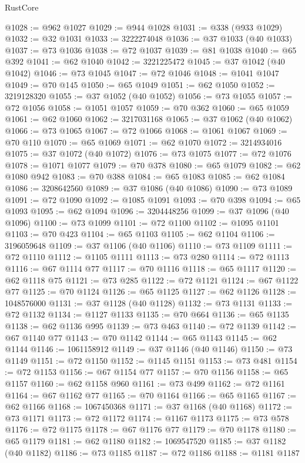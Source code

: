 \begin{lexlean}{RustCore}
\begin{coremodule}
@1028 := @962 @1027
@1029 := @944 @1028
@1031 := @338 (@933 @1029)
@1032 := @32 @1031
@1033 := 3222274048
@1036 := @37 @1033 (@40 @1033)
@1037 := @73 @1036
@1038 := @72 @1037
@1039 := @81 @1038
@1040 := @65 @392
@1041 := @62 @1040
@1042 := 3221225472
@1045 := @37 @1042 (@40 @1042)
@1046 := @73 @1045
@1047 := @72 @1046
@1048 := @1041 @1047
@1049 := @70 @145
@1050 := @65 @1049
@1051 := @62 @1050
@1052 := 3219128320
@1055 := @37 @1052 (@40 @1052)
@1056 := @73 @1055
@1057 := @72 @1056
@1058 := @1051 @1057
@1059 := @70 @362
@1060 := @65 @1059
@1061 := @62 @1060
@1062 := 3217031168
@1065 := @37 @1062 (@40 @1062)
@1066 := @73 @1065
@1067 := @72 @1066
@1068 := @1061 @1067
@1069 := @70 @110
@1070 := @65 @1069
@1071 := @62 @1070
@1072 := 3214934016
@1075 := @37 @1072 (@40 @1072)
@1076 := @73 @1075
@1077 := @72 @1076
@1078 := @1071 @1077
@1079 := @70 @378
@1080 := @65 @1079
@1082 := @62 @1080 @942
@1083 := @70 @388
@1084 := @65 @1083
@1085 := @62 @1084
@1086 := 3208642560
@1089 := @37 @1086 (@40 @1086)
@1090 := @73 @1089
@1091 := @72 @1090
@1092 := @1085 @1091
@1093 := @70 @398
@1094 := @65 @1093
@1095 := @62 @1094
@1096 := 3204448256
@1099 := @37 @1096 (@40 @1096)
@1100 := @73 @1099
@1101 := @72 @1100
@1102 := @1095 @1101
@1103 := @70 @423
@1104 := @65 @1103
@1105 := @62 @1104
@1106 := 3196059648
@1109 := @37 @1106 (@40 @1106)
@1110 := @73 @1109
@1111 := @72 @1110
@1112 := @1105 @1111
@1113 := @73 @280
@1114 := @72 @1113
@1116 := @67 @1114 @77
@1117 := @70 @1116
@1118 := @65 @1117
@1120 := @62 @1118 @75
@1121 := @73 @285
@1122 := @72 @1121
@1124 := @67 @1122 @77
@1125 := @70 @1124
@1126 := @65 @1125
@1127 := @62 @1126
@1128 := 1048576000
@1131 := @37 @1128 (@40 @1128)
@1132 := @73 @1131
@1133 := @72 @1132
@1134 := @1127 @1133
@1135 := @70 @664
@1136 := @65 @1135
@1138 := @62 @1136 @995
@1139 := @73 @463
@1140 := @72 @1139
@1142 := @67 @1140 @77
@1143 := @70 @1142
@1144 := @65 @1143
@1145 := @62 @1144
@1146 := 1061158912
@1149 := @37 @1146 (@40 @1146)
@1150 := @73 @1149
@1151 := @72 @1150
@1152 := @1145 @1151
@1153 := @73 @481
@1154 := @72 @1153
@1156 := @67 @1154 @77
@1157 := @70 @1156
@1158 := @65 @1157
@1160 := @62 @1158 @960
@1161 := @73 @499
@1162 := @72 @1161
@1164 := @67 @1162 @77
@1165 := @70 @1164
@1166 := @65 @1165
@1167 := @62 @1166
@1168 := 1067450368
@1171 := @37 @1168 (@40 @1168)
@1172 := @73 @1171
@1173 := @72 @1172
@1174 := @1167 @1173
@1175 := @73 @578
@1176 := @72 @1175
@1178 := @67 @1176 @77
@1179 := @70 @1178
@1180 := @65 @1179
@1181 := @62 @1180
@1182 := 1069547520
@1185 := @37 @1182 (@40 @1182)
@1186 := @73 @1185
@1187 := @72 @1186
@1188 := @1181 @1187

\end{coremodule}
\end{lexlean}
